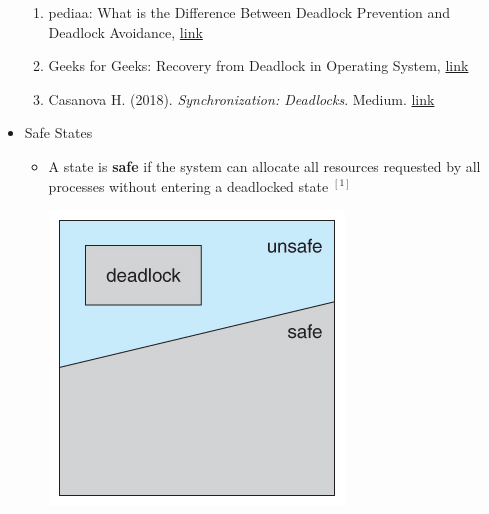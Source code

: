 \documentclass[12pt]{article}
\begin{document}
\begin{itemize}
    \begin{enumerate}[1)]
        \item pediaa: What is the Difference Between Deadlock Prevention and Deadlock Avoidance, \href{https://pediaa.com/what-is-the-difference-between-deadlock-prevention-and-deadlock-avoidance/}{link}
        \item Geeks for Geeks: Recovery from Deadlock in Operating System, \href{https://www.geeksforgeeks.org/recovery-from-deadlock-in-operating-system/?ref=rp}{link}
        \item Casanova H. (2018). \textit{Synchronization: Deadlocks}. Medium. \href{http://www2.hawaii.edu/~esb/2018fall.ics332/oct08.pdf}{link}
    \end{enumerate}
    \item Safe States

    \begin{itemize}
        \item A state is \textbf{safe} if the system can allocate all resources
        requested by all processes without entering a deadlocked state $^{[1]}$

        \begin{center}
            \includegraphics[width=0.6\linewidth]{images/week_10_notes_1_3.jpg}
        \end{center}


\end{itemize}
\end{itemize}
\end{document}
